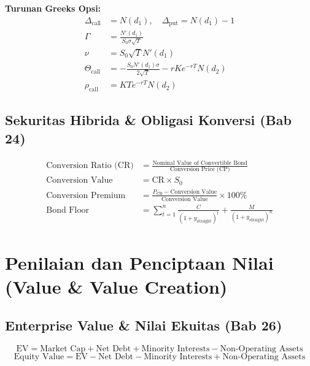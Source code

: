 \documentclass[10pt,a4paper]{article}
\begin{document}
\textbf{Turunan Greeks Opsi:}
\begin{align}
\Delta_{\text{call}} &= N(d_1), \quad \Delta_{\text{put}} = N(d_1) - 1 \\
\Gamma &= \frac{N'(d_1)}{S_0 \sigma \sqrt{T}} \\
\nu &= S_0 \sqrt{T} N'(d_1) \\
\Theta_{\text{call}} &= -\frac{S_0 N'(d_1) \sigma}{2\sqrt{T}} - r K e^{-rT} N(d_2) \\
\rho_{\text{call}} &= K T e^{-rT} N(d_2)
\end{align}

\subsection{Sekuritas Hibrida \& Obligasi Konversi (Bab 24)}

\begin{align}
\text{Conversion Ratio (CR)} &= \frac{\text{Nominal Value of Convertible Bond}}{\text{Conversion Price (CP)}} \\
\text{Conversion Value} &= \text{CR} \times S_0 \\
\text{Conversion Premium} &= \frac{P_{\text{CB}} - \text{Conversion Value}}{\text{Conversion Value}} \times 100\% \\
\text{Bond Floor} &= \sum_{t=1}^n \frac{C}{(1 + y_{\text{straight}})^t} + \frac{M}{(1 + y_{\text{straight}})^n}
\end{align}

\section{Penilaian dan Penciptaan Nilai (Value \& Value Creation)}

\subsection{Enterprise Value \& Nilai Ekuitas (Bab 26)}

\begin{equation}
\text{EV} = \text{Market Cap} + \text{Net Debt} + \text{Minority Interests} - \text{Non-Operating Assets}
\end{equation}
\begin{equation}
\text{Equity Value} = \text{EV} - \text{Net Debt} - \text{Minority Interests} + \text{Non-Operating Assets}
\end{equation}
\end{document}

